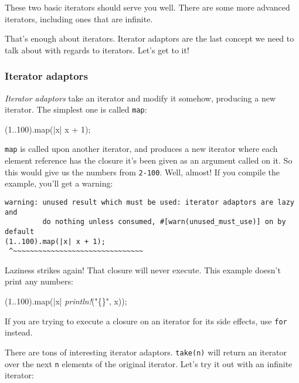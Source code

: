 \documentclass[a4paper,]{book}
\newenvironment{Shaded}{\begin{snugshade}}{\end{snugshade}}
\newcommand{\DecValTok}[1]{\textcolor[rgb]{0.00,0.00,0.81}{{#1}}}
\newcommand{\StringTok}[1]{\textcolor[rgb]{0.31,0.60,0.02}{{#1}}}
\newcommand{\PreprocessorTok}[1]{\textcolor[rgb]{0.56,0.35,0.01}{\textit{{#1}}}}
\newcommand{\NormalTok}[1]{{#1}}
\begin{document}
These two basic iterators should serve you well. There are some more
advanced iterators, including ones that are infinite.

That's enough about iterators. Iterator adaptors are the last concept we
need to talk about with regards to iterators. Let's get to it!

\subsubsection{Iterator adaptors}\label{iterator-adaptors}

\emph{Iterator adaptors} take an iterator and modify it somehow,
producing a new iterator. The simplest one is called \texttt{map}:

\begin{Shaded}
\begin{Highlighting}[]
\NormalTok{(}\DecValTok{1.}\NormalTok{.}\DecValTok{100}\NormalTok{).map(|x| x + }\DecValTok{1}\NormalTok{);}
\end{Highlighting}
\end{Shaded}

\texttt{map} is called upon another iterator, and produces a new
iterator where each element reference has the closure it's been given as
an argument called on it. So this would give us the numbers from
\texttt{2-100}. Well, almost! If you compile the example, you'll get a
warning:

\begin{verbatim}
warning: unused result which must be used: iterator adaptors are lazy and
         do nothing unless consumed, #[warn(unused_must_use)] on by default
(1..100).map(|x| x + 1);
 ^~~~~~~~~~~~~~~~~~~~~~~~~~~~~~~~
\end{verbatim}

Laziness strikes again! That closure will never execute. This example
doesn't print any numbers:

\begin{Shaded}
\begin{Highlighting}[]
\NormalTok{(}\DecValTok{1.}\NormalTok{.}\DecValTok{100}\NormalTok{).map(|x| }\PreprocessorTok{println!}\NormalTok{(}\StringTok{"\{\}"}\NormalTok{, x));}
\end{Highlighting}
\end{Shaded}

If you are trying to execute a closure on an iterator for its side
effects, use \texttt{for} instead.

There are tons of interesting iterator adaptors. \texttt{take(n)} will
return an iterator over the next \texttt{n} elements of the original
iterator. Let's try it out with an infinite iterator:
\end{document}

